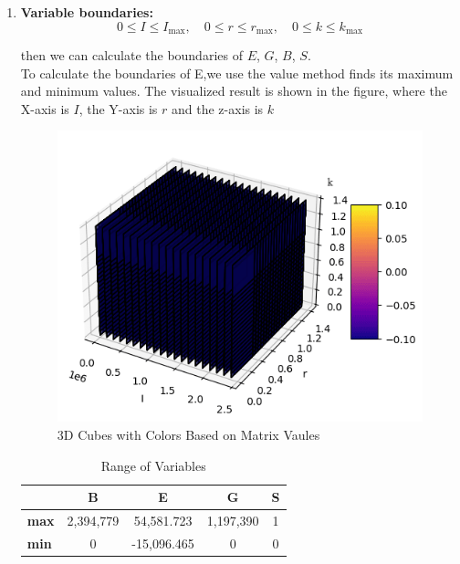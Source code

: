 \documentclass[UTF8]{mcmthesis}
\begin{document}
\begin{enumerate}
         \item \textbf{Variable boundaries:} \\
                \[
        0 \leq I \leq I_{\text{max}}, \quad 0 \leq r \leq r_{\text{max}}, \quad 0 \leq k \leq k_{\text{max}}
        \]

        then we can calculate the boundaries of $E$, $G$, $B$, $S$.\\
        To calculate the boundaries of E,we use the value method finds its maximum and minimum values. The visualized result is shown in the figure, where the X-axis is $I$, the Y-axis is $r$ and the z-axis is $k$
        
        \begin{figure}[htbp]
            \centering
            \includegraphics[width=12cm]{cubenweleng.png}
            \caption{3D Cubes with Colors Based on Matrix Vaules}
        \end{figure}
    
        \begin{table}[htbp]
            \centering
            \caption{Range of Variables}
            \begin{tabular}{lcccc}
                \toprule
                & \textbf{B} & \textbf{E} & \textbf{G} & \textbf{S} \\
                \midrule
                \textbf{max} & 2,394,779 & 54,581.723 & 1,197,390 & 1 \\
                \textbf{min} & 0 & -15,096.465 & 0 & 0 \\
                \bottomrule
            \end{tabular}
            \label{tab:data_summary}
        \end{table}      
        \end{enumerate}
\end{document}
